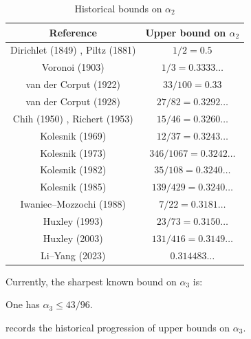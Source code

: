 \begin{table}[ht]
    \def\arraystretch{1.2}
    \centering
    \caption{Historical bounds on $\alpha_2$}
    \begin{tabular}{|c|c|}
    \hline
    Reference & Upper bound on $\alpha_2$\\
    \hline
    Dirichlet (1849) \cite{dirichlet_bestimmung_1849}, Piltz (1881) \cite{piltz_gesetz_1881} & $1/2 = 0.5$\\
    \hline
    Voronoi (1903) \cite{voronoi_sur_1903} & $1/3 = 0.3333\ldots$\\
    \hline
    van der Corput (1922) \cite{van_der_corput_verscharfung_1922} & $33/100 = 0.33$\\
    \hline
    van der Corput (1928) \cite{van_der_corput_zum_1928} & $27/82 = 0.3292\ldots$\\
    \hline
    Chih (1950) \cite{chih_on_1950}, Richert (1953) \cite{richert_verschrfung_1953} & $15/46 = 0.3260\ldots$\\
    \hline
    Kolesnik (1969) \cite{kolesnik_improvement_1969} & $12/37 = 0.3243\ldots$\\
    \hline
    Kolesnik (1973) \cite{kolesnik_1973} & $346/1067 = 0.3242\ldots$\\
    \hline
    Kolesnik (1982) \cite{kolesnik_order_1982} & $35/108 = 0.3240\ldots$\\
    \hline
    Kolesnik (1985) \cite[p. 118]{kolesnik_1985} & $139/429 = 0.3240\ldots$\\
    \hline
    Iwaniec--Mozzochi (1988) \cite{iwaniec_divisor_1988} & $7/22 = 0.3181\ldots$\\
    \hline
    Huxley (1993) \cite{huxley_exponential_1993} & $23/73 = 0.3150\ldots$\\
    \hline
    Huxley (2003) \cite{huxley_exponential_2003} & $131/416 = 0.3149\ldots$\\
    \hline
    Li--Yang (2023) \cite{li_yang_gauss_2024} & $0.314483\ldots$\\
    \hline
    \end{tabular}
\label{div-alpha2-table}
\end{table}

Currently, the sharpest known bound on $\alpha_3$ is:

\begin{theorem}\label{divisor-kolesnik}\cite{kolesnik} One has $\alpha_3 \leq 43/96$.
\end{theorem}

 records the historical progression of upper bounds on $\alpha_3$.

